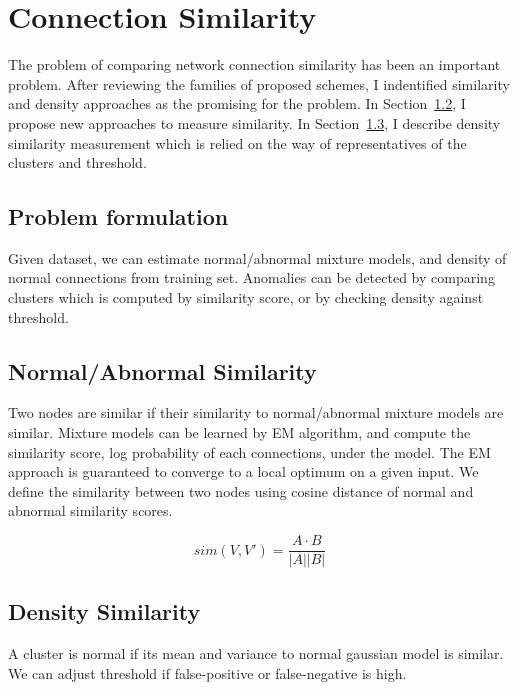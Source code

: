 \section{Connection Similarity}
The problem of comparing network connection similarity has been an important problem. \cite{}
After reviewing the families of proposed schemes, I indentified similarity and density approaches as the promising for the problem. 
In Section~\ref{subsec:normalabnormalsimilarity}, I propose new approaches to measure similarity.
In Section~\ref{subsec:densitysimilarity}, I describe density similarity measurement which is relied on the way of representatives of the clusters and threshold.

\subsection{Problem formulation}
\label{subsec:problemformulation}
Given dataset, we can estimate normal/abnormal mixture models, and density of normal connections from training set.
Anomalies can be detected by comparing clusters which is computed by similarity score, or by checking density against threshold.


\subsection{Normal/Abnormal Similarity}
\label{subsec:normalabnormalsimilarity}
Two nodes are similar if their similarity to normal/abnormal mixture models are similar.
Mixture models can be learned by EM algorithm, and compute the similarity score, log probability of each connections, under the model.
The EM approach is guaranteed to converge to a local optimum on a given input.
We define the similarity between two nodes using cosine distance of normal and abnormal similarity scores.

\begin{equation}
    sim(V, V') = \frac{A \cdot B}{|A| |B|}
\end{equation}

\subsection{Density Similarity}
\label{subsec:densitysimilarity}
A cluster is normal if its mean and variance to normal gaussian model is similar. 
We can adjust threshold if false-positive or false-negative is high. 
